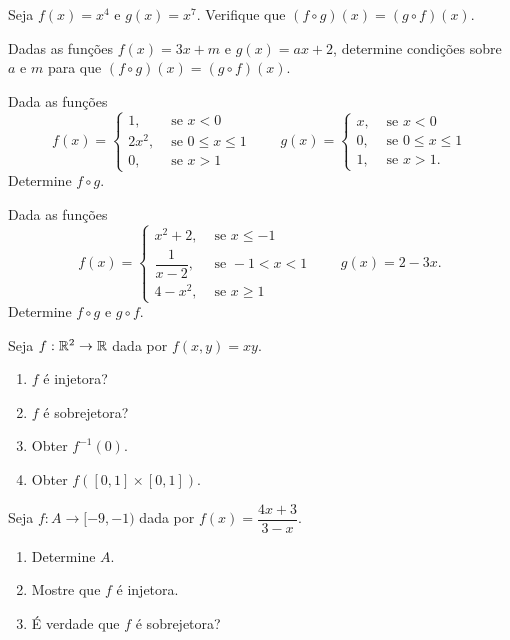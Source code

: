 \documentclass[12pt]{article}
\begin{document}
\vesp

\questao Seja $f(x) = x^4$ e $g(x) = x^7$. Verifique que $(f\circ g)(x) = (g\circ f)(x)$.

\vesp

\questao Dadas as funções $f(x) = 3x + m$ e $g(x) = ax + 2$, determine condições sobre $a$ e $m$ para que $(f\circ g)(x) = (g\circ f)(x)$.

\vesp

\questao Dada as funções
\[
	f(x) = \begin{cases}
		1, & \mbox{ se } x < 0\\
		2x^2, & \mbox{ se } 0 \le x \le 1\\
		0, & \mbox{ se } x > 1
	\end{cases} \qquad g(x) = \begin{cases}
		x, & \mbox{ se } x < 0\\
		0, & \mbox{ se } 0 \le x \le 1\\
		1, & \mbox{ se } x > 1.
	\end{cases}
\]
Determine $f\circ g$.

\vesp

\questao Dada as funções
\[
	f(x) = \begin{cases}
		x^2 + 2, & \mbox{ se } x \le -1\\
		\dfrac{1}{x - 2}, & \mbox{ se } -1 < x < 1\\
		4 - x^2, & \mbox{ se } x \ge 1
	\end{cases} \qquad g(x) = 2 - 3x.
\]
Determine $f\circ g$ e $g \circ f$.

\vesp

\questao Seja $f: \mathbb{R}^2 \to \mathbb{R}$ dada por $f(x,y) = xy$.
\begin{enumerate}[label={\alph*})]
\item $f$ {\'e} injetora?
\item $f$ {\'e} sobrejetora?
\item Obter $f^{-1}({0})$.
\item Obter $f([0,1]\times [0,1])$.
\end{enumerate}

\vesp

\questao Seja $f : A \to [-9,-1)$ dada por $f(x) = \dfrac{4x + 3}{3 - x}$.
\begin{enumerate}
	\item Determine $A$.
	\item Mostre que $f$ é injetora.
	\item É verdade que $f$ é sobrejetora?
\end{enumerate}
\end{document}
